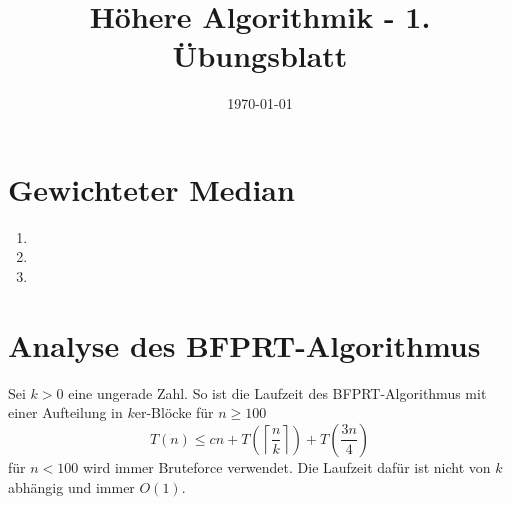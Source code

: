 \documentclass[a4paper,10pt]{scrartcl}
\title{H\"ohere Algorithmik - 1. \"Ubungsblatt}
\author{\Authors}
\date{\today}
\begin{document}
\maketitle

\section{Gewichteter Median}
\begin{enumerate}
\item   
\item   
\item   
\end{enumerate}


\section{Analyse des BFPRT-Algorithmus}
Sei $k > 0$ eine ungerade Zahl. So ist die Laufzeit des BFPRT-Algorithmus mit einer Aufteilung in $k$er-Blöcke für $n \geq 100$
\[T(n) \leq cn + T\left(\left\lceil\frac{n}{k}\right\rceil\right) + T\left(\frac{3n}{4}\right)\tag{s. VL}\]
für $n < 100$ wird immer Bruteforce verwendet. Die Laufzeit dafür ist nicht von $k$ abhängig und immer $O(1)$.
\end{document}
